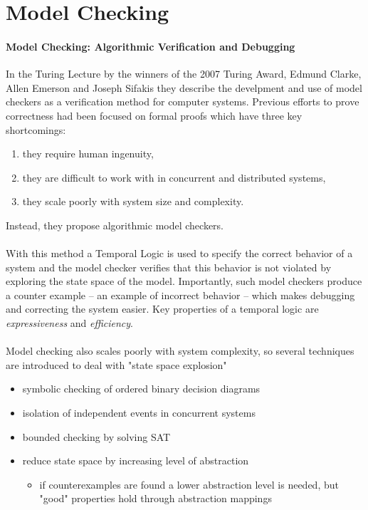 \documentclass{uit-thesis}
\begin{document}
\section{Model Checking}\label{sec:model-checking}
\paragraph{Model Checking: Algorithmic Verification and Debugging~\cite{Clarke2009}}
In the Turing Lecture by the winners of the 2007 Turing Award, Edmund Clarke, Allen Emerson and Joseph Sifakis they describe the develpment and use of model checkers as a verification method for computer systems. Previous efforts to prove correctness had been focused on formal proofs which have three key shortcomings:
\begin{enumerate}
    \item they require human ingenuity,
    \item they are difficult to work with in concurrent and distributed systems,
    \item they scale poorly with system size and complexity.
\end{enumerate}
Instead, they propose algorithmic model checkers.
\\\\
With this method a Temporal Logic is used to specify the correct behavior of a system and the model checker verifies that this behavior is not violated by exploring the state space of the model. Importantly, such model checkers produce a counter example -- an example of incorrect behavior -- which makes debugging and correcting the system easier.
Key properties of a temporal logic are \textit{expressiveness} and \textit{efficiency}.
\\\\
Model checking also scales poorly with system complexity, so several techniques are introduced to deal with "state space explosion"
\begin{itemize}
    \item symbolic checking of ordered binary decision diagrams
    \item isolation of independent events in concurrent systems
    \item bounded checking by solving SAT
    \item reduce state space by increasing level of abstraction
    \begin{itemize}
        \item if counterexamples are found a lower abstraction level is needed, but "good" properties hold through abstraction mappings
    \end{itemize}
\end{itemize}
\end{document}
